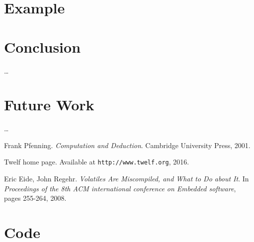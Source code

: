 
\section{Example}


%


\section{Conclusion}

\ldots


\section{Future Work}


\ldots

\clearpage

\begin{thebibliography}{9}

Frank Pfenning.
\textit{Computation and Deduction}.
Cambridge University Press, 2001.

Twelf home page. Available at \texttt{http://www.twelf.org}, 2016.

Eric Eide, John Regehr.
\textit{Volatiles Are Miscompiled, and What to Do about It}.
In \textit{Proceedings of the 8th ACM international conference on Embedded software}, pages 255-264, 2008.

\end{thebibliography}


\appendix

\section{Code}
\label{sec:code}
